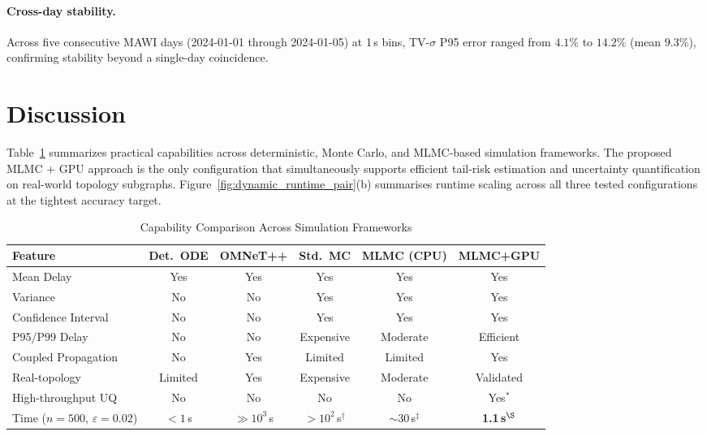 \documentclass[pdflatex,sn-mathphys-num]{sn-jnl}
\theoremstyle{thmstyleone}%
\theoremstyle{thmstyletwo}%
\theoremstyle{thmstylethree}%
\begin{document}
\paragraph{Cross-day stability.}
Across five consecutive MAWI days (2024-01-01 through 2024-01-05) at 1\,s bins, TV-$\sigma$ P95 error ranged from $4.1\%$ to $14.2\%$ (mean $9.3\%$), confirming stability beyond a single-day coincidence.



\section{Discussion}
\label{sec:discussion}

Table~\ref{tab:capability} summarizes practical capabilities across deterministic, Monte Carlo,
and MLMC-based simulation frameworks. The proposed MLMC + GPU approach is the only configuration
that simultaneously supports efficient tail-risk estimation and uncertainty quantification on
real-world topology subgraphs. Figure~\ref{fig:dynamic_runtime_pair}(b) summarises runtime scaling across all three tested configurations at the tightest accuracy target.

\begin{table}[!t]
\caption{Capability Comparison Across Simulation Frameworks}
\label{tab:capability}
\centering\small
\setlength{\tabcolsep}{4pt}%
\begin{tabular*}{\linewidth}{@{\extracolsep\fill}p{2.2cm} c c c c c@{}}
\toprule
Feature & Det.\ ODE & OMNeT++ & Std.\ MC & MLMC (CPU) & MLMC+GPU \\
\midrule
Mean Delay & Yes & Yes & Yes & Yes & Yes \\
Variance & No & No & Yes & Yes & Yes \\
Confidence Interval & No & No & Yes & Yes & Yes \\
P95/P99 Delay & No & No & Expensive & Moderate & Efficient \\
Coupled Propagation & No & Yes & Limited & Limited & Yes \\
Real-topology & Limited & Yes & Expensive & Moderate & Validated \\
High-throughput UQ & No & No & No & No & Yes$^*$ \\
\midrule
Time ($n{=}500$, $\varepsilon{=}0.02$) & $<1$\,s & $\gg\!10^3$\,s & $>10^2$\,s$^\dagger$ &
$\sim\!30$\,s$^\ddagger$ & \textbf{1.1\,s}$^\S$ \\
\bottomrule
\end{tabular*}
\end{table}
\end{document}
